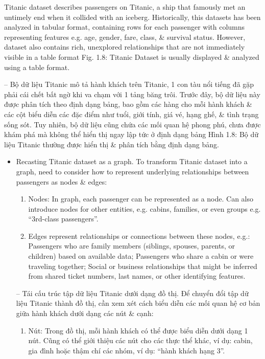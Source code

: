\documentclass{article}
\begin{document}
\begin{itemize}
\begin{itemize}
\begin{itemize}
            Titanic dataset describes passengers on Titanic, a ship that famously met an untimely end when it collided with an iceberg. Historically, this datasets has been analyzed in tabular format, containing rows for each passenger with columns representing features e.g. age, gender, fare, class, \& survival status. However, dataset also contains rich, unexplored relationships that are not immediately visible in a table format {\sf Fig. 1.8: Titanic Dataset is usually displayed \& analyzed using a table format.}

            -- Bộ dữ liệu Titanic mô tả hành khách trên Titanic, 1 con tàu nổi tiếng đã gặp phải cái chết bất ngờ khi va chạm với 1 tảng băng trôi. Trước đây, bộ dữ liệu này được phân tích theo định dạng bảng, bao gồm các hàng cho mỗi hành khách \& các cột biểu diễn các đặc điểm như tuổi, giới tính, giá vé, hạng ghế, \& tình trạng sống sót. Tuy nhiên, bộ dữ liệu cũng chứa các mối quan hệ phong phú, chưa được khám phá mà không thể hiển thị ngay lập tức ở định dạng bảng {\sf Hình 1.8: Bộ dữ liệu Titanic thường được hiển thị \& phân tích bằng định dạng bảng.}
            \begin{itemize}
                \item {\sf Recasting Titanic dataset as a graph.} To transform Titanic dataset into a graph, need to consider how to represent underlying relationships between passengers as nodes \& edges:
                \begin{enumerate}
                    \item Nodes: In graph, each passenger can be represented as a node. Can also introduce nodes for other entities, e.g. cabins, families, or even groups e.g. ``3rd-class passengers''.
                    \item Edges represent relationships or connections between these nodes, e.g.: Passengers who are family members (siblings, spouses, parents, or children) based on available data; Passengers who share a cabin or were traveling together; Social or business relationships that might be inferred from shared ticket numbers, last names, or other identifying features.
                \end{enumerate}
                -- {\sf Tái cấu trúc tập dữ liệu Titanic dưới dạng đồ thị.} Để chuyển đổi tập dữ liệu Titanic thành đồ thị, cần xem xét cách biểu diễn các mối quan hệ cơ bản giữa hành khách dưới dạng các nút \& cạnh:
                \begin{enumerate}
                    \item Nút: Trong đồ thị, mỗi hành khách có thể được biểu diễn dưới dạng 1 nút. Cũng có thể giới thiệu các nút cho các thực thể khác, ví dụ: cabin, gia đình hoặc thậm chí các nhóm, ví dụ: ``hành khách hạng 3''.

\end{enumerate}
\end{itemize}
\end{itemize}
\end{itemize}
\end{itemize}
\end{document}

